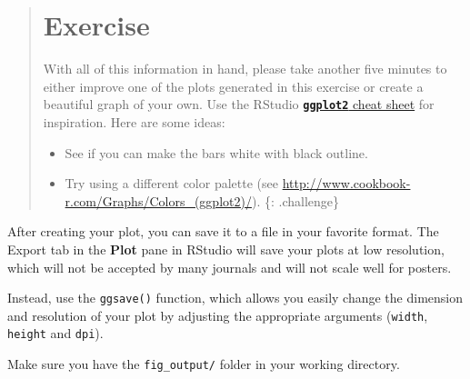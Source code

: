 \documentclass[]{book}
\providecommand{\tightlist}{%
  \setlength{\itemsep}{0pt}\setlength{\parskip}{0pt}}
\begin{document}
\begin{quote}
\section{Exercise}\label{exercise-16}

With all of this information in hand, please take another five minutes
to either improve one of the plots generated in this exercise or create
a beautiful graph of your own. Use the RStudio
\href{https://www.rstudio.com/wp-content/uploads/2016/11/ggplot2-cheatsheet-2.1.pdf}{\textbf{\texttt{ggplot2}}
cheat sheet} for inspiration. Here are some ideas:

\begin{itemize}
\tightlist
\item
  See if you can make the bars white with black outline.
\item
  Try using a different color palette (see
  \url{http://www.cookbook-r.com/Graphs/Colors_(ggplot2)/}). \{:
  .challenge\}
\end{itemize}
\end{quote}

After creating your plot, you can save it to a file in your favorite
format. The Export tab in the \textbf{Plot} pane in RStudio will save
your plots at low resolution, which will not be accepted by many
journals and will not scale well for posters.

Instead, use the \texttt{ggsave()} function, which allows you easily
change the dimension and resolution of your plot by adjusting the
appropriate arguments (\texttt{width}, \texttt{height} and
\texttt{dpi}).

Make sure you have the \texttt{fig\_output/} folder in your working
directory.
\end{document}
